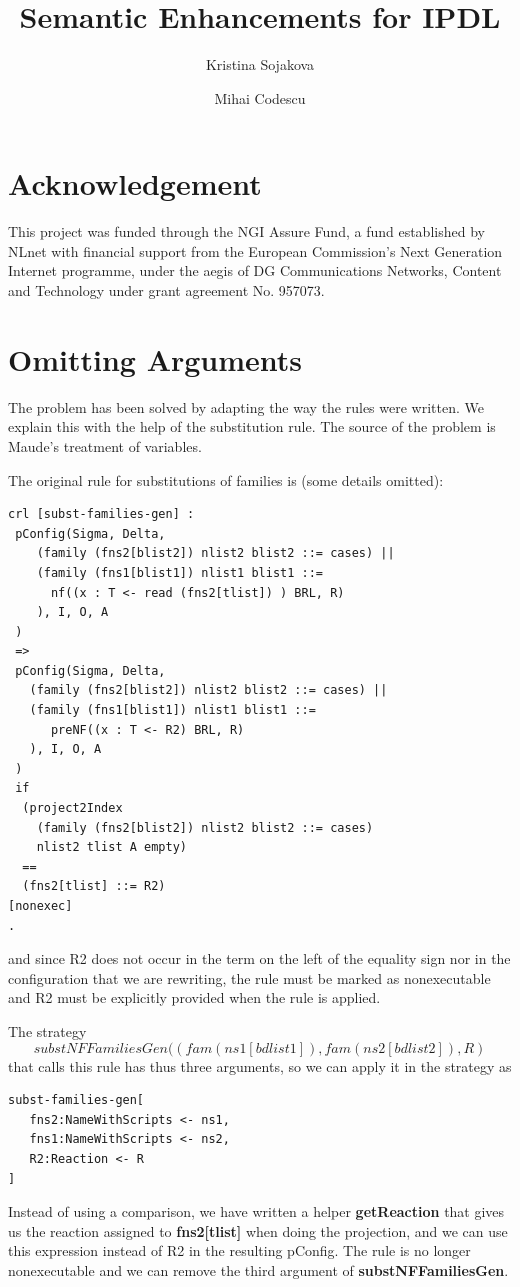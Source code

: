 \documentclass{article}
\title{Semantic Enhancements for IPDL}
\author{Kristina Sojakova \and Mihai Codescu}
\date{}
\begin{document}
\maketitle
\section*{\small Acknowledgement}
This project was funded through the NGI Assure Fund, a fund established by NLnet with financial support from the European Commission's Next Generation Internet programme, under the aegis of DG Communications Networks, Content and Technology under grant agreement No. 957073.
 
\section{Omitting Arguments}

The problem has been solved by adapting the way the rules were written.
We explain this with the help of the substitution rule. The source of
the problem is Maude's treatment of variables.

The original rule for substitutions of families is (some details omitted):
\begin{lstlisting}
crl [subst-families-gen] :
 pConfig(Sigma, Delta, 
    (family (fns2[blist2]) nlist2 blist2 ::= cases) || 
    (family (fns1[blist1]) nlist1 blist1 ::=
      nf((x : T <- read (fns2[tlist]) ) BRL, R)
    ), I, O, A
 )
 => 
 pConfig(Sigma, Delta, 
   (family (fns2[blist2]) nlist2 blist2 ::= cases) || 
   (family (fns1[blist1]) nlist1 blist1 ::=
      preNF((x : T <- R2) BRL, R)
   ), I, O, A
 )
 if 
  (project2Index 
    (family (fns2[blist2]) nlist2 blist2 ::= cases) 
    nlist2 tlist A empty) 
  == 
  (fns2[tlist] ::= R2)
[nonexec] 
.
\end{lstlisting}
and since R2 does not occur in the term on the left of the equality sign
nor in the configuration that we are rewriting, the rule must be marked
as nonexecutable and R2 must be explicitly provided when the rule is applied.

The strategy $$
\mathit{substNFFamiliesGen((fam (ns1[bdlist1]), fam (ns2[bdlist2]), R)}
$$ 
that calls this rule has thus three arguments, so we can 
apply it in the strategy as 
\begin{lstlisting}
subst-families-gen[
   fns2:NameWithScripts <- ns1, 
   fns1:NameWithScripts <- ns2,
   R2:Reaction <- R
]
\end{lstlisting}

Instead of using a comparison, we have written a helper \textbf{getReaction} that gives us the reaction assigned to
\textbf{fns2[tlist]} when doing the projection, and we can use this
expression instead of R2 in the resulting pConfig. The rule is no longer
nonexecutable and we can remove the third argument of \textbf{substNFFamiliesGen}.
\end{document}
